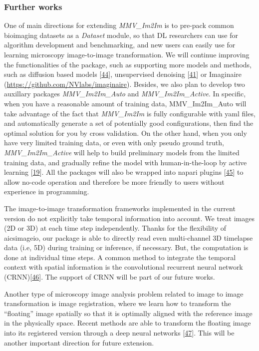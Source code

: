 \hypertarget{further-works}{%
\subsubsection{Further works}\label{further-works}}

One of main directions for extending \emph{MMV\_Im2Im} is to pre-pack common bioimaging datasets as a \emph{Dataset} module, so that DL researchers can use for algorithm development and benchmarking, and new users can easily use for learning microscopy image-to-image transformation. We will continue improving the functionalities of the package, such as supporting more models and methods, such as diffusion based models {[}\protect\hyperlink{ref-1A3yurr7m}{44}{]}, unsupervised denoising {[}\protect\hyperlink{ref-4vnyY9J9}{41}{]} or Imaginaire (\url{https://github.com/NVlabs/imaginaire}). Besides, we also plan to develop two auxillary packages \emph{MMV\_Im2Im\_Auto} and \emph{MMV\_Im2Im\_Active}. In specific, when you have a reasonable amount of training data, MMV\_Im2Im\_Auto will take advantage of the fact that \emph{MMV\_Im2Im} is fully configurable with yaml files, and automatically generate a set of potentially good configurations, then find the optimal solution for you by cross validation. On the other hand, when you only have very limited training data, or even with only pseudo ground truth, \emph{MMV\_Im2Im\_Active} will help to build preliminary models from the limited training data, and gradually refine the model with human-in-the-loop by active learning {[}\protect\hyperlink{ref-jM3v1UjQ}{19}{]}. All the packages will also be wrapped into napari plugins {[}\protect\hyperlink{ref-YEMgt2T4}{45}{]} to allow no-code operation and therefore be more friendly to users without experience in programming.

The image-to-image transformation frameworks implemented in the current version do not explicitly take temporal information into account. We treat images (2D or 3D) at each time step independently. Thanks for the flexibility of aicsimageio, our package is able to directly read even multi-channel 3D timelapse data (i.e, 5D) during training or inference, if necessary. But, the computation is done at individual time steps. A common method to integrate the temporal context with spatial information is the convolutional recurrent neural network (CRNN){[}\protect\hyperlink{ref-s2RBSHdH}{46}{]}. The support of CRNN will be part of our future works.

Another type of microscopy image analysis problem related to image to image transformation is image registration, where we learn how to transform the ``floating'' image spatially so that it is optimally aligned with the reference image in the physically space. Recent methods are able to transform the floating image into its registered version through a deep neural networks {[}\protect\hyperlink{ref-1Fh9QLxl9}{47}{]}. This will be another important direction for future extension.

